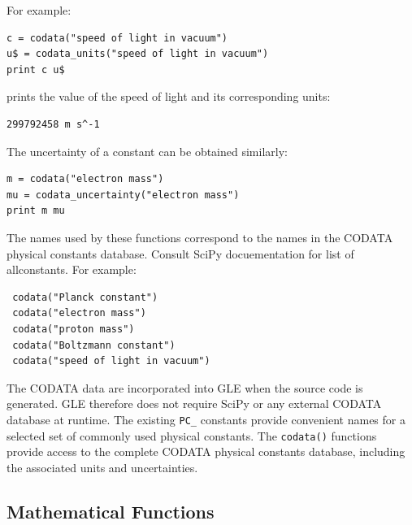 For example:
\begin{verbatim}
c = codata("speed of light in vacuum")
u$ = codata_units("speed of light in vacuum")
print c u$
\end{verbatim}

prints the value of the speed of light and its corresponding units:

\begin{verbatim}
299792458 m s^-1
\end{verbatim}

The uncertainty of a constant can be obtained similarly:

\begin{verbatim}
m = codata("electron mass")
mu = codata_uncertainty("electron mass")
print m mu
\end{verbatim}

The names used by these functions correspond to the names in the CODATA physical constants database. Consult SciPy docuementation for list of allconstants. For example:

\begin{verbatim}
 codata("Planck constant")
 codata("electron mass")
 codata("proton mass")
 codata("Boltzmann constant")
 codata("speed of light in vacuum")
\end{verbatim}

The CODATA data are incorporated into GLE when the source code is generated. GLE therefore does not require SciPy or any external CODATA database at runtime. The existing \texttt{PC\_} constants provide convenient names for a selected set of commonly used physical constants. The \texttt{codata()} functions provide access to the complete CODATA physical constants database, including the associated units and uncertainties.

\vspace{2ex}

\subsection{Mathematical Functions}

